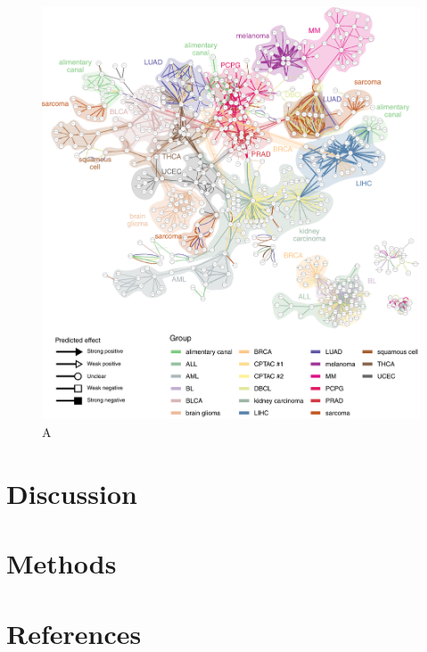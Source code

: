 \begin{figure}[htb!]
	\centering
	\includegraphics[width=\linewidth]{fig/tcga/grouped_interactions.pdf} 
	\caption{
		A
	}
	\label{fig:tcga}
\end{figure}


\section{Discussion}

\section{Methods}

\clearpage
\section{References}
\printbibliography[heading=none]
